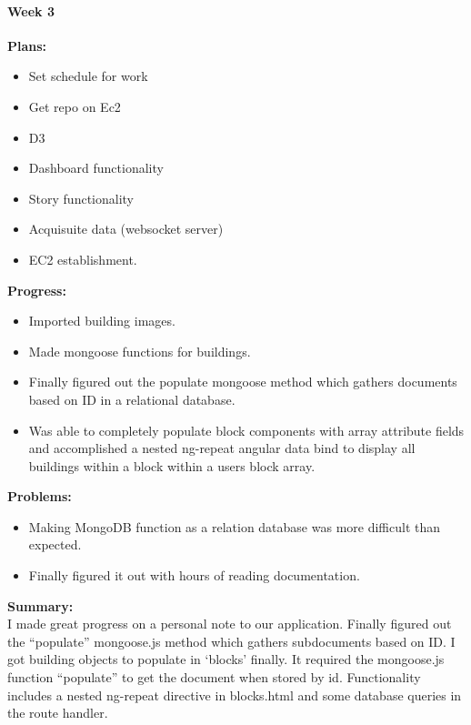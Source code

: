 \paragraph{Week 3}
\begin{adjustwidth}{2.5em}{0pt}
    \vspace{-0.5cm}\textbf{Plans:}
    \vspace{-0.5cm}
    \begin{itemize}
        \item Set schedule for work
        \item Get repo on Ec2
        \item D3
        \item Dashboard functionality
        \item Story functionality
        \item Acquisuite data (websocket server)
        \item EC2 establishment.
    \end{itemize} 
    \vspace{-0.3cm}\textbf{Progress:}
    \vspace{-0.5cm}
    \begin{itemize}
        \item Imported building images.
        \item Made mongoose functions for buildings.
        \item Finally figured out the populate mongoose method which gathers documents based on ID in a relational database.
        \item Was able to completely populate block components with array attribute fields and accomplished a nested ng-repeat angular data bind to display all buildings within a block within a users block array. 
    \end{itemize} 
    \vspace{-0.3cm}\textbf{Problems:}
    \vspace{-0.5cm}
    \begin{itemize}
        \item Making MongoDB function as a relation database was more difficult than expected. 
        \item Finally figured it out with hours of reading documentation.
    \end{itemize}  
    \vspace{-0.3cm}\noindent\textbf{Summary:}\\
    \noindent I made great progress on a personal note to our application. Finally figured out the ``populate'' mongoose.js method which gathers subdocuments based on ID. I got building objects to populate in `blocks' finally. It required the mongoose.js function ``populate'' to get the document when stored by id. Functionality includes a nested ng-repeat directive in blocks.html and some database queries in the route handler.
\end{adjustwidth} 
